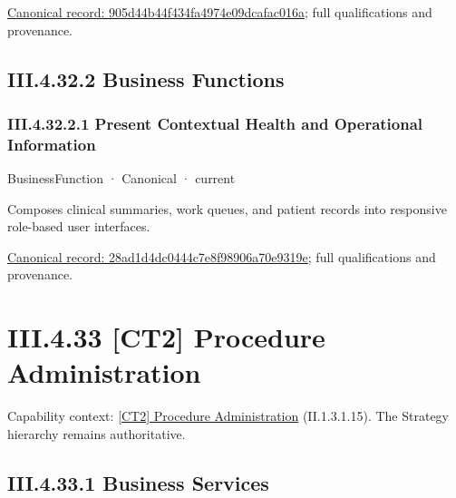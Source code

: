 {\footnotesize \href{../../../../continuum/business/business-service/905d44b44f434fa4974e09dcafac016a.md}{Canonical record: 905d44b44f434fa4974e09dcafac016a}; full qualifications and provenance.}\par
\subsection*{III.4.32.2 Business Functions}
\label{navigation:III.4.32.2}

\subsubsection*{III.4.32.2.1 Present Contextual Health and Operational Information}
\label{navigation:III.4.32.2.1}

\label{element:28ad1d4dc0444c7e8f98906a70e9319e}
{\small BusinessFunction · Canonical · current}\par

Composes clinical summaries, work queues, and patient records into responsive role-based user interfaces.


{\footnotesize \href{../../../../continuum/business/business-function/28ad1d4dc0444c7e8f98906a70e9319e.md}{Canonical record: 28ad1d4dc0444c7e8f98906a70e9319e}; full qualifications and provenance.}\par
\section*{III.4.33 [CT2] Procedure Administration}
\label{navigation:III.4.33}

{\small Capability context: \hyperref[element:649dd7cc26094e539386a050086dfb91]{[CT2] Procedure Administration} (II.1.3.1.15). The Strategy hierarchy remains authoritative.}\par
\subsection*{III.4.33.1 Business Services}
\label{navigation:III.4.33.1}

